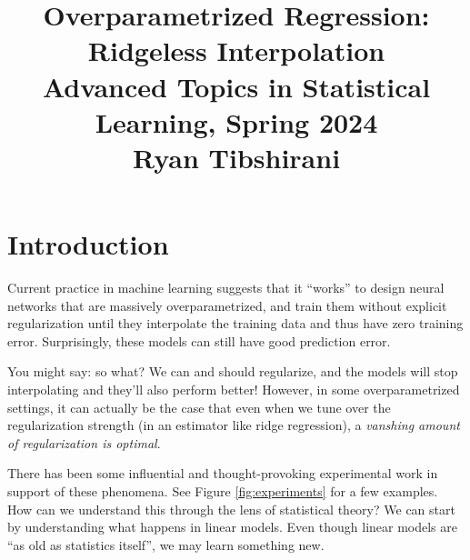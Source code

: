 \documentclass{article}
\title{Overparametrized Regression: Ridgeless Interpolation \\ \smallskip
\large Advanced Topics in Statistical Learning, Spring 2024 \\ \smallskip
Ryan Tibshirani}
\date{}
\begin{document}
\maketitle
\RaggedRight
\vspace{-50pt}

\section{Introduction}

Current practice in machine learning suggests that it ``works'' to design neural
networks that are massively overparametrized, and train them without explicit
regularization until they interpolate the training data and thus have zero
training error. Surprisingly, these models can still have good prediction error.     

You might say: so what? We can and should regularize, and the models will stop  
interpolating and they'll also perform better! However, in some overparametrized  
settings, it can actually be the case that even when we tune over the
regularization strength (in an  estimator like ridge regression), a
\emph{vanshing amount of regularization is optimal}. 

There has been some influential and thought-provoking experimental work in
support of these phenomena. See Figure \ref{fig:experiments} for a few
examples. How can we understand this through the lens of statistical theory?
We can start by understanding what happens in linear models. Even though linear
models are ``as old as statistics itself'', we may learn something new.    
\end{document}
